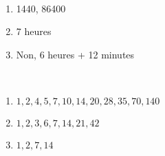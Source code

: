 \documentclass[a4paper,12pt]{article}
\begin{document}
\begin{exercice}\ 
	
	\begin{enumerate}
		\item 1440, 86400
		\item 7 heures
		\item Non, 6 heures + 12 minutes
	\end{enumerate}
\end{exercice}

\begin{exercice}\ 
	
	\begin{enumerate}
		\item $1, 2, 4, 5, 7, 10, 14, 20, 28, 35, 70, 140$
		\item $1, 2, 3, 6, 7, 14, 21, 42$
		\item $1, 2, 7, 14$
	\end{enumerate}
\end{exercice}
\end{document}
